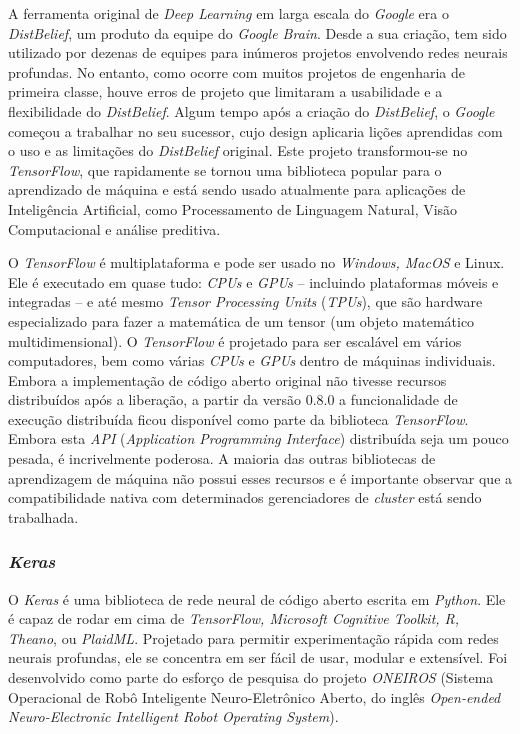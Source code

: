 A ferramenta original de \textit{Deep Learning} em larga escala do \textit{Google} era o \textit{DistBelief}, um produto da equipe do \textit{Google Brain}. Desde a sua criação, tem sido utilizado por dezenas de equipes para inúmeros projetos envolvendo redes neurais profundas. No entanto, como ocorre com muitos projetos de engenharia de primeira classe, houve erros de projeto que limitaram a usabilidade e a flexibilidade do \textit{DistBelief}. Algum tempo após a criação do \textit{DistBelief}, o \textit{Google} começou a trabalhar no seu sucessor, cujo design aplicaria lições aprendidas com o uso e as limitações do \textit{DistBelief} original. Este projeto transformou-se no \textit{TensorFlow}, que rapidamente se tornou uma biblioteca popular para o aprendizado de máquina e está sendo usado atualmente para aplicações de Inteligência Artificial, como Processamento de Linguagem Natural, Visão Computacional e análise preditiva.

O \textit{TensorFlow} é multiplataforma e pode ser usado no \textit{Windows, MacOS} e Linux. Ele é executado em quase tudo: \textit{CPUs} e \textit{GPUs} – incluindo plataformas móveis e integradas – e até mesmo \textit{Tensor Processing Units} (\textit{TPUs}), que são hardware especializado para fazer a matemática de um tensor (um objeto matemático multidimensional). O \textit{TensorFlow} é projetado para ser escalável em vários computadores, bem como várias \textit{CPUs} e \textit{GPUs} dentro de máquinas individuais. Embora a implementação de código aberto original não tivesse recursos distribuídos após a liberação, a partir da versão 0.8.0 a funcionalidade de execução distribuída ficou disponível como parte da biblioteca \textit{TensorFlow}. Embora esta \textit{API} (\textit{Application Programming Interface}) distribuída seja um pouco pesada, é incrivelmente poderosa. A maioria das outras bibliotecas de aprendizagem de máquina não possui esses recursos e é importante observar que a compatibilidade nativa com determinados gerenciadores de \textit{cluster} está sendo trabalhada.

\subsubsection{\textit{Keras}}

O \textit{Keras} é uma biblioteca de rede neural de código aberto escrita em \textit{Python}. Ele é capaz de rodar em cima de \textit{TensorFlow, Microsoft Cognitive Toolkit, R, Theano}, ou \textit{PlaidML}. Projetado para permitir experimentação rápida com redes neurais profundas, ele se concentra em ser fácil de usar, modular e extensível. Foi desenvolvido como parte do esforço de pesquisa do projeto \textit{ONEIROS} (Sistema Operacional de Robô Inteligente Neuro-Eletrônico Aberto, do inglês \textit{Open-ended Neuro-Electronic Intelligent Robot Operating System}).


